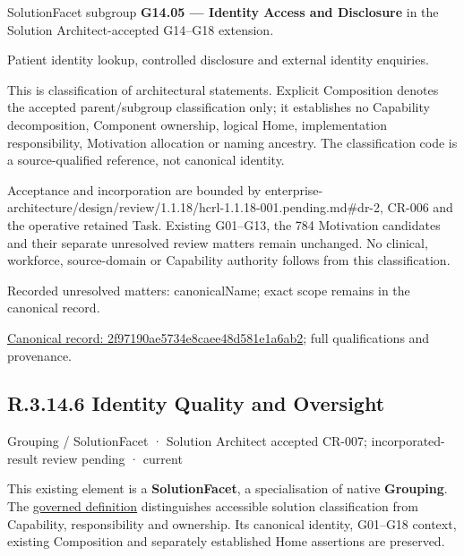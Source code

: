 SolutionFacet subgroup \textbf{G14.05 — Identity Access and Disclosure} in the Solution Architect-accepted G14–G18 extension.



Patient identity lookup, controlled disclosure and external identity enquiries.



This is classification of architectural statements. Explicit Composition denotes the accepted parent/subgroup classification only; it establishes no Capability decomposition, Component ownership, logical Home, implementation responsibility, Motivation allocation or naming ancestry. The classification code is a source-qualified reference, not canonical identity.



Acceptance and incorporation are bounded by enterprise-architecture/design/review/1.1.18/hcrl-1.1.18-001.pending.md\#dr-2, CR-006 and the operative retained Task. Existing G01–G13, the 784 Motivation candidates and their separate unresolved review matters remain unchanged. No clinical, workforce, source-domain or Capability authority follows from this classification.


{\small Recorded unresolved matters: canonicalName; exact scope remains in the canonical record.}\par
{\footnotesize \href{../../../../../../../continuum/grouping/2f97190ae5734e8caee48d581e1a6ab2.md}{Canonical record: 2f97190ae5734e8caee48d581e1a6ab2}; full qualifications and provenance.}\par
\subsection*{R.3.14.6 Identity Quality and Oversight}
\label{navigation:R.3.14.6}

\label{element:ba2e95cc11374757bd0945148da43b07}
{\small Grouping / SolutionFacet · Solution Architect accepted CR-007; incorporated-result review pending · current}\par

This existing element is a \textbf{SolutionFacet}, a specialisation of native
\textbf{Grouping}. The \href{\detokenize{../../../../../../../governance/continuum-representation.md#solutionfacet-classification--1119-candidate}}{governed definition}
distinguishes accessible solution classification from Capability, responsibility
and ownership. Its canonical identity, G01–G18 context, existing Composition
and separately established Home assertions are preserved.



